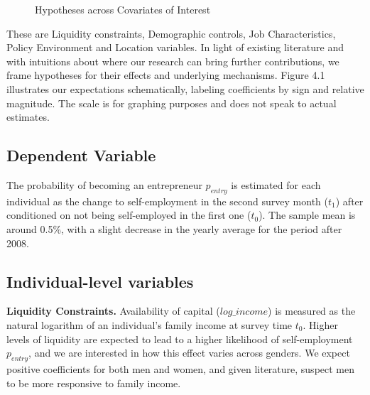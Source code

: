\begin{figure}[hbtp]
        \caption{Hypotheses across Covariates of Interest}  
\end{figure}

These are Liquidity constraints, Demographic controls, Job Characteristics, Policy Environment and Location variables. In light of existing literature and with intuitions about where our research can bring further contributions, we frame hypotheses for their effects and underlying mechanisms. Figure 4.1 illustrates our expectations schematically, labeling coefficients by sign and relative magnitude. The scale is for graphing purposes and does not speak to actual estimates.


\subsection{Dependent Variable}

The probability of becoming an entrepreneur $p_{entry}$ is estimated for each individual as the change to self-employment in the second survey month ($t_1$) after conditioned on not being self-employed in the first one ($t_0$). The sample mean is around 0.5\%, with a slight decrease in the yearly average for the period after 2008. 



\subsection{Individual-level variables}

\textbf{Liquidity Constraints.} Availability of capital ($log\_income$) is measured as the natural logarithm of an individual's family income at survey time $t_0$. Higher levels of liquidity are expected to lead to a higher likelihood of self-employment $p_{entry}$, and we are interested in how this effect varies across genders. We expect positive coefficients for both men and women, and given literature, suspect men to be more responsive to family income. 

